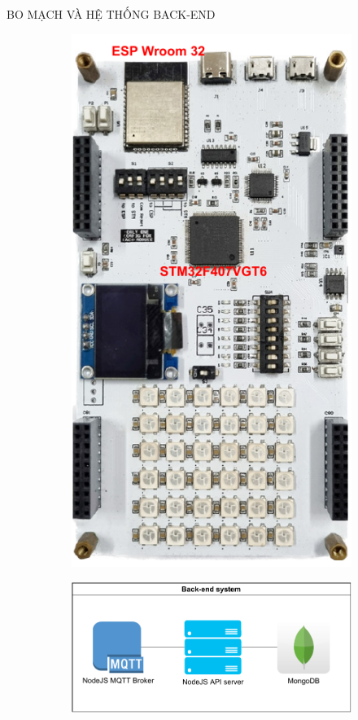 \begin{frame}{BO MẠCH VÀ HỆ THỐNG BACK-END}
\begin{figure}
	\centering
	\subfigure
	{
		\begin{minipage}{0.2\linewidth}
    		\begin{figure}
    			\centering
    			\includegraphics[scale=0.5]{pic/Presentation-Page-4-Bo-mach.pdf}
    		\end{figure}
    	\end{minipage}
	}
	\subfigure
	{
		\begin{minipage}{0.7\linewidth}
    		\begin{figure}
				\raggedleft
    			\includegraphics[scale=.6]{pic/Presentation-Page-5-Back-end-system.pdf}
    		\end{figure}
    	\end{minipage}
	}
\end{figure}
\end{frame}

